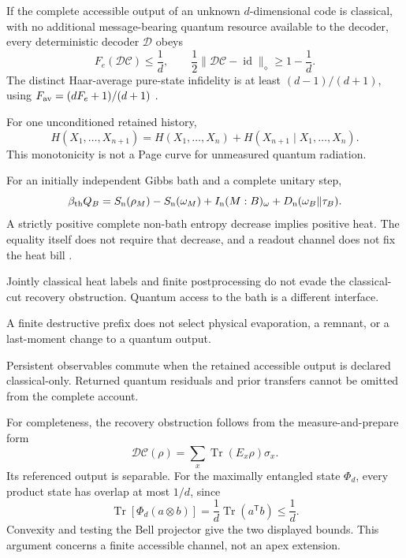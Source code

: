 \documentclass[11pt,a4paper]{article}
\newcommand{\id}{\operatorname{id}}
\newcommand{\norm}[1]{\lVert #1\rVert}
\DeclareMathOperator{\Tr}{Tr}
\theoremstyle{plain}
\theoremstyle{definition}
\theoremstyle{remark}
\numberwithin{equation}{section}
\begin{document}
\begin{description}[style=nextline,leftmargin=0pt]
\item[A: recovery metric.]
If the complete accessible output of an unknown \(d\)-dimensional
code is classical, with no additional message-bearing quantum
resource available to the decoder, every deterministic decoder
\(\mathcal D\) obeys
\[
F_e(\mathcal D\mathcal C)\le\frac1d,\qquad
\frac12\norm{\mathcal D\mathcal C-\id}_\diamond
 \ge1-\frac1d.
\]
The distinct Haar-average pure-state infidelity is at least
\((d-1)/(d+1)\), using
\(F_{\rm av}=(dF_e+1)/(d+1)\)
\cite{HSR,NielsenAverage}.

\item[B: append-only entropy.]
For one unconditioned retained history,
\[
H(X_1,\ldots,X_{n+1})
 =H(X_1,\ldots,X_n)
  +H(X_{n+1}\mid X_1,\ldots,X_n).
\]
This monotonicity is not a Page curve for unmeasured quantum
radiation.

\item[C: conditional thermal accounting.]
For an initially independent Gibbs bath and a complete unitary
step,
\[
\beta_{\rm th}Q_B
 =S_{\rm n}(\rho_M)-S_{\rm n}(\omega_M)
  +I_{\rm n}(M:B)_\omega
  +D_{\rm n}(\omega_B\Vert\tau_B).
\]
A strictly positive complete non-bath entropy decrease implies
positive heat. The equality itself does not require that decrease,
and a readout channel does not fix the heat bill
\cite{ReebWolf}.

\item[D: complete classical exterior.]
Jointly classical heat labels and finite postprocessing do not
evade the classical-cut recovery obstruction. Quantum access to
the bath is a different interface.

\item[E: endpoint.]
A finite destructive prefix does not select physical evaporation,
a remnant, or a last-moment change to a quantum output.

\item[F: classical persistence.]
Persistent observables commute when the retained accessible
output is declared classical-only. Returned quantum residuals
and prior transfers cannot be omitted from the complete account.
\end{description}

For completeness, the recovery obstruction follows from the
measure-and-prepare form
\[
\mathcal D\mathcal C(\rho)
 =\sum_x\Tr(E_x\rho)\sigma_x.
\]
Its referenced output is separable.
For the maximally entangled state \(\Phi_d\), every product state
has overlap at most \(1/d\), since
\[
\Tr[\Phi_d(a\otimes b)]
 =\frac1d\Tr(a^{\mathsf T}b)\le\frac1d.
\]
Convexity and testing the Bell projector give the two displayed
bounds. This argument concerns a finite accessible channel,
not an apex extension.
\end{document}
